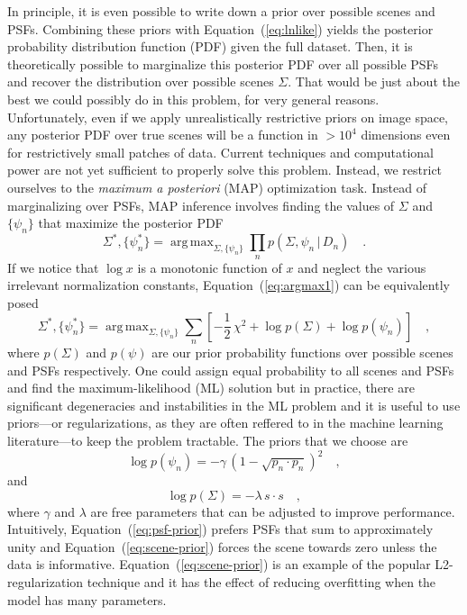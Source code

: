 \documentclass[12pt,preprint]{aastex}
\newcommand{\Eq}[1]{Equation~(\ref{eq:#1})}
\newcommand{\eq}[1]{\Eq{#1}}
\newcommand{\eqlabel}[1]{\label{eq:#1}}
\newcommand{\given}{\,|\,}
\DeclareMathOperator*{\argmax}{arg\,max}
\newcommand{\data}{\ensuremath{D}}
\newcommand{\scene}{\ensuremath{\Sigma}}
\newcommand{\psf}{\ensuremath{\psi}}
\newcommand{\svec}{\ensuremath{s}}
\newcommand{\pvec}{\ensuremath{p}}
\begin{document}
In principle, it is even possible to write down a prior over possible
scenes and PSFs. Combining these priors with \eq{lnlike} yields the
posterior probability distribution function (PDF) given the full dataset.
Then, it is theoretically possible to marginalize this posterior PDF
over all possible PSFs and recover the distribution over possible
scenes $\scene$. That would be just about the best we could possibly do
in this problem, for very general reasons.
Unfortunately, even if we apply unrealistically restrictive priors on
image space, any posterior PDF over true scenes will be a function in
$> 10^4$ dimensions even for restrictively small patches of data.
Current techniques and computational power are not yet sufficient
to properly solve this problem. Instead, we restrict ourselves to the
\emph{maximum a posteriori} (MAP) optimization task. Instead of
marginalizing over PSFs, MAP inference involves finding the values of
$\scene$ and $\{\psf_n\}$ that maximize the posterior PDF
\begin{equation}\eqlabel{argmax1}
    \scene^*, \{\psf^*_n\} = \argmax_{\scene, \{\psf_n\}}
        \prod_n p ( \scene, \psf_n \given \data_n) \quad.
\end{equation}
If we notice that $\log x$ is a monotonic function of $x$ and neglect
the various irrelevant normalization constants, \eq{argmax1} can be
equivalently posed
\begin{equation}\eqlabel{argmax2}
    \scene^*, \{\psf^*_n\} = \argmax_{\scene, \{\psf_n\}}
        \sum_n \left [ -\frac{1}{2} \, \chi^2
            + \log p (\scene) + \log p (\psf_n)
        \right ] \quad ,
\end{equation}
where $p (\scene)$ and $p(\psf)$ are our prior probability functions
over possible scenes and PSFs respectively. One could assign equal
probability to all scenes and PSFs and find the maximum-likelihood (ML)
solution but in practice, there are significant degeneracies and
instabilities in the ML problem and it is useful to use priors---or
regularizations, as they are often reffered to in the machine learning
literature---to keep the problem tractable. The priors that we choose
are
\begin{equation}\eqlabel{psf-prior}
    \log p(\psf_n) = - \gamma \, \left ( 1 - \sqrt{\pvec_n \cdot \pvec_n}
        \right )^2 \quad,
\end{equation}
and
\begin{equation}\eqlabel{scene-prior}
    \log p(\scene) = - \lambda \, \svec \cdot \svec \quad,
\end{equation}
where $\gamma$ and $\lambda$ are free parameters that can be adjusted
to improve performance. Intuitively, \eq{psf-prior} prefers PSFs that sum
to approximately unity and \eq{scene-prior} forces the scene towards zero
unless the data is informative. \Eq{scene-prior} is an example of the
popular L2-regularization technique and it has the effect of reducing
overfitting when the model has many parameters.
\end{document}
